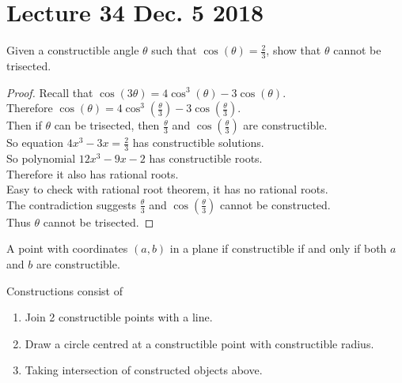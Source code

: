 \documentclass[10pt]{article}
\begin{document}
	\section{Lecture 34 Dec. 5 2018}
		\begin{example}
			Given a constructible angle $\theta$ such that $\cos(\theta) = \frac{2}{3}$, show that $\theta$ cannot be trisected.
			\begin{proof}
				Recall that $\cos(3\theta) = 4 \cos^3(\theta) - 3 \cos(\theta)$. \\
				Therefore $\cos(\theta) = 4 \cos^3(\frac{\theta}{3}) - 3 \cos(\frac{\theta}{3})$. \\
				Then if $\theta$ can be trisected, then $\frac{\theta}{3}$ and $\cos(\frac{\theta}{3})$ are constructible. \\
				So equation $4x^3 - 3x = \frac{2}{3}$ has constructible solutions. \\
				So polynomial $12 x^3 - 9 x - 2$ has constructible roots. \\
				Therefore it also has rational roots. \\
				Easy to check with rational root theorem, it has no rational roots. \\
				The contradiction suggests $\frac{\theta}{3}$ and $\cos(\frac{\theta}{3})$ cannot be constructed. \\
				Thus $\theta$ cannot be trisected.
			\end{proof}
		\end{example}
		
		\begin{proposition}
			A point with coordinates $(a, b)$ in a plane if constructible if and only if both $a$ and $b$ are constructible.
		\end{proposition}
		
		\begin{definition}
			Constructions consist of
			\begin{enumerate}
				\item Join 2 constructible points with a line.
				\item Draw a circle centred at a constructible point with constructible radius.
				\item Taking intersection of constructed objects above.
			\end{enumerate}
		\end{definition}
		
\end{document}
